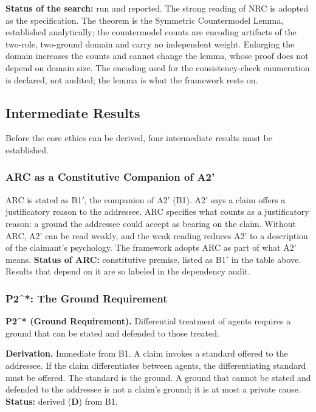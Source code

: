 \documentclass[11pt]{article}
\def\ensuremath#1{#1}%
\def\mathrm#1{#1}%
\newcommand{\statusD}{\textcolor{stD}{\textbf{D}}}
\newcommand{\Atwo}{\texorpdfstring{\ensuremath{\mathrm{A2}'}}{A2'}}
\newcommand{\Ptwo}{\texorpdfstring{\ensuremath{\mathrm{P2}^{*}}}{P2*}}
\begin{document}
\textbf{Status of the search:} run and reported. The strong reading of NRC is adopted as the specification. The theorem is the Symmetric Countermodel Lemma, established analytically; the countermodel counts are encoding artifacts of the two-role, two-ground domain and carry no independent weight. Enlarging the domain increases the counts and cannot change the lemma, whose proof does not depend on domain size. The encoding used for the consistency-check enumeration is declared, not audited; the lemma is what the framework rests on.

\subsection{Intermediate Results}
Before the core ethics can be derived, four intermediate results must be established.

\subsubsection{ARC as a Constitutive Companion of \Atwo{}}
ARC is stated as B1$'$, the companion of \Atwo{} (B1). \Atwo{} says a claim offers a justificatory reason to the addressee. ARC specifies what counts as a justificatory reason: a ground the addressee could accept as bearing on the claim. Without ARC, \Atwo{} can be read weakly, and the weak reading reduces \Atwo{} to a description of the claimant's psychology. The framework adopts ARC as part of what \Atwo{} means. \textbf{Status of ARC:} constitutive premise, listed as B1$'$ in the table above. Results that depend on it are so labeled in the dependency audit.

\subsubsection{\Ptwo{}: The Ground Requirement}
\begin{paperbox}
\textbf{\Ptwo{} (Ground Requirement).} Differential treatment of agents requires a ground that can be stated and defended to those treated.
\end{paperbox}
\textbf{Derivation.} Immediate from B1. A claim invokes a standard offered to the addressee. If the claim differentiates between agents, the differentiating standard must be offered. The standard is the ground. A ground that cannot be stated and defended to the addressee is not a claim's ground; it is at most a private cause.
\textbf{Status:} derived (\statusD{}) from B1.
\end{document}
